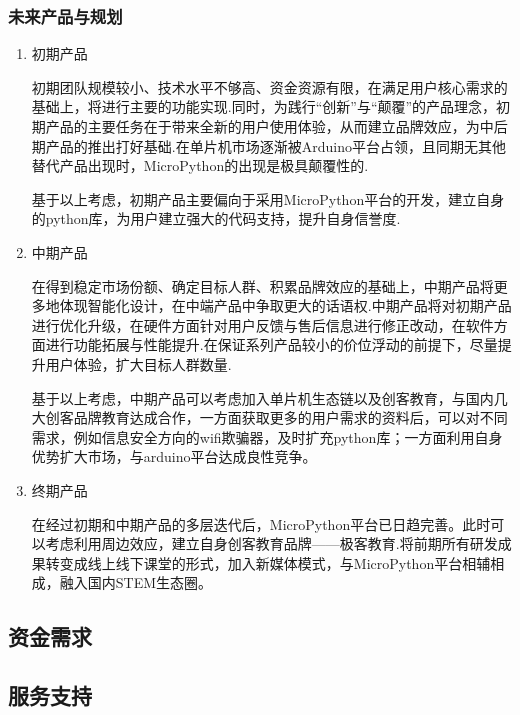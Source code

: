\subsubsection{未来产品与规划}
\begin{enumerate}[(1)]

\item 初期产品

      初期团队规模较小、技术水平不够高、资金资源有限，在满足用户核心需求的基础上，将进行主要的功能实现.同时，为践行“创新”与“颠覆”的产品理念，初期产品的主要任务在于带来全新的用户使用体验，从而建立品牌效应，为中后期产品的推出打好基础.在单片机市场逐渐被Arduino平台占领，且同期无其他替代产品出现时，MicroPython的出现是极具颠覆性的.

      基于以上考虑，初期产品主要偏向于采用MicroPython平台的开发，建立自身的python库，为用户建立强大的代码支持，提升自身信誉度.

\item 中期产品

      在得到稳定市场份额、确定目标人群、积累品牌效应的基础上，中期产品将更多地体现智能化设计，在中端产品中争取更大的话语权.中期产品将对初期产品进行优化升级，在硬件方面针对用户反馈与售后信息进行修正改动，在软件方面进行功能拓展与性能提升.在保证系列产品较小的价位浮动的前提下，尽量提升用户体验，扩大目标人群数量.

      基于以上考虑，中期产品可以考虑加入单片机生态链以及创客教育，与国内几大创客品牌教育达成合作，一方面获取更多的用户需求的资料后，可以对不同需求，例如信息安全方向的wifi欺骗器，及时扩充python库；一方面利用自身优势扩大市场，与arduino平台达成良性竞争。

\item 终期产品

      在经过初期和中期产品的多层迭代后，MicroPython平台已日趋完善。此时可以考虑利用周边效应，建立自身创客教育品牌——极客教育.将前期所有研发成果转变成线上线下课堂的形式，加入新媒体模式，与MicroPython平台相辅相成，融入国内STEM生态圈。

\end{enumerate}

\subsection{资金需求}



\subsection{服务支持}

